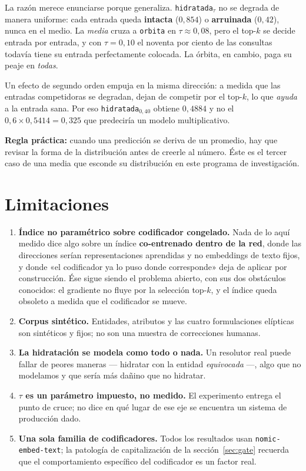 \documentclass[11pt,a4paper]{article}
\begin{document}
La razón merece enunciarse porque generaliza. \texttt{hidratada}$_\tau$ no se degrada de manera
uniforme: cada entrada queda \textbf{intacta} ($0{,}854$) o \textbf{arruinada} ($0{,}42$), nunca en el
medio. La \emph{media} cruza a \texttt{orbita} en $\tau \approx 0{,}08$, pero el top-$k$ se decide
entrada por entrada, y con $\tau = 0{,}10$ el noventa por ciento de las consultas todavía tiene su
entrada perfectamente colocada. La órbita, en cambio, paga su peaje en \emph{todas}.

Un efecto de segundo orden empuja en la misma dirección: a medida que las entradas competidoras se
degradan, dejan de competir por el top-$k$, lo que \emph{ayuda} a la entrada sana. Por eso
\texttt{hidratada}$_{0{,}40}$ obtiene $0{,}4884$ y no el $0{,}6 \times 0{,}5414 = 0{,}325$ que
predeciría un modelo multiplicativo.

\textbf{Regla práctica:} cuando una predicción se deriva de un promedio, hay que revisar la forma de
la distribución antes de creerle al número. Éste es el tercer caso de una media que esconde su
distribución en este programa de investigación.

\section{Limitaciones}

\begin{enumerate}
\item \textbf{Índice no paramétrico sobre codificador congelado.} Nada de lo aquí medido dice algo
      sobre un índice \textbf{co-entrenado dentro de la red}, donde las direcciones serían
      representaciones aprendidas y no embeddings de texto fijos, y donde «el codificador ya lo puso
      donde corresponde» deja de aplicar por construcción. Ése sigue siendo el problema abierto, con
      sus dos obstáculos conocidos: el gradiente no fluye por la selección top-$k$, y el índice queda
      obsoleto a medida que el codificador se mueve.
\item \textbf{Corpus sintético.} Entidades, atributos y las cuatro formulaciones elípticas son
      sintéticos y fijos; no son una muestra de correcciones humanas.
\item \textbf{La hidratación se modela como todo o nada.} Un resolutor real puede fallar de peores
      maneras --- hidratar con la entidad \emph{equivocada} ---, algo que no modelamos y que sería más
      dañino que no hidratar.
\item \textbf{$\tau$ es un parámetro impuesto, no medido.} El experimento entrega el punto de cruce;
      no dice en qué lugar de ese eje se encuentra un sistema de producción dado.
\item \textbf{Una sola familia de codificadores.} Todos los resultados usan
      \texttt{nomic-embed-text}; la patología de capitalización de la sección~\ref{sec:gate} recuerda
      que el comportamiento específico del codificador es un factor real.
\end{enumerate}
\end{document}
